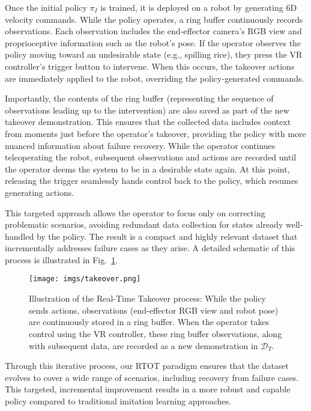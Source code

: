 Once the initial policy $\pi_I$ is trained, it is deployed on a robot by generating $6$D velocity commands. While the policy operates, a ring buffer continuously records observations. Each observation includes the end-effector camera’s RGB view and proprioceptive information such as the robot's pose. If the operator observes the policy moving toward an undesirable state (e.g., spilling rice), they press the VR controller’s trigger button to intervene. When this occurs, the takeover actions are immediately applied to the robot, overriding the policy-generated commands.

Importantly, the contents of the ring buffer (representing the sequence of observations leading up to the intervention) are also saved as part of the new takeover demonstration. This ensures that the collected data includes context from moments just before the operator's takeover, providing the policy with more nuanced information about failure recovery. While the operator continues teleoperating the robot, subsequent observations and actions are recorded until the operator deems the system to be in a desirable state again. At this point, releasing the trigger seamlessly hands control back to the policy, which resumes generating actions.

This targeted approach allows the operator to focus only on correcting problematic scenarios, avoiding redundant data collection for states already well-handled by the policy. The result is a compact and highly relevant dataset that incrementally addresses failure cases as they arise. A detailed schematic of this process is illustrated in Fig.~\ref{fig:takeover}.

\begin{figure}[t] \centering \texttt{[image: imgs/takeover.png]} \caption{Illustration of the Real-Time Takeover process: While the policy sends actions, observations (end-effector RGB view and robot pose) are continuously stored in a ring buffer. When the operator takes control using the VR controller, these ring buffer observations, along with subsequent data, are recorded as a new demonstration in $\mathcal{D}_T$.} \label{fig:takeover} \end{figure}

Through this iterative process, our RTOT paradigm ensures that the dataset evolves to cover a wide range of scenarios, including recovery from failure cases. This targeted, incremental improvement results in a more robust and capable policy compared to traditional imitation learning approaches.
